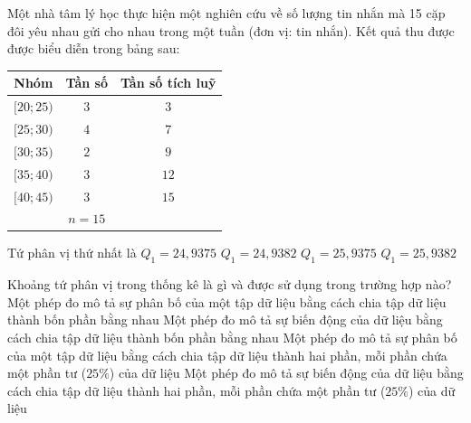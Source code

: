 \begin{ex}%
	Một nhà tâm lý học thực hiện một nghiên cứu về số lượng tin nhắn mà 15 cặp đôi yêu nhau gửi cho nhau trong một tuần (đơn vị: tin nhắn). Kết quả thu được được biểu diễn trong bảng sau:
	\begin{center}
		\begin{tabular}{|c|c|c|}
			\hline 
			Nhóm & Tần số & Tần số tích luỹ \\
			\hline 
			$[20; 25)$ & $3$ & $3$ \\
			$[25; 30)$ & $4$ & $7$ \\
			$[30; 35)$ & $2$ & $9$ \\
			$[35; 40)$ & $3$ & $12$ \\
			$[40; 45)$ & $3$ & $15$ \\
			\hline 
			& $n=15$ & \\
			\hline
		\end{tabular}
	\end{center}
	Tứ phân vị thứ nhất là
	\choice
	{$Q_1=24{,}9375$}
	{$Q_1=24{,}9382$}
	{\True $Q_1=25{,}9375$}
	{$Q_1= 25{,}9382$}
	\loigiai{
		Số lượng mẫu là $n=15$.\\
		Ta có $\dfrac{n}{4}=\dfrac{15}{4}=3{,}75$, và nằm trong nhóm $[25; 30)$. \\
		Vậy $Q_1=25+\left(\dfrac{3{,}75-3}{4}\right) \cdot 5 = 25+\left(\dfrac{0{,}75}{4}\right) \cdot 5 = 25+0{,}9375 = 25{,}9375$.
	}
\end{ex}
\begin{ex}%
	Khoảng tứ phân vị trong thống kê là gì và được sử dụng trong trường hợp nào?
	\choice
	{\True Một phép đo mô tả sự phân bố của một tập dữ liệu bằng cách chia tập dữ liệu thành bốn phần bằng nhau}
	{Một phép đo mô tả sự biến động của dữ liệu bằng cách chia tập dữ liệu thành bốn phần bằng nhau}
	{Một phép đo mô tả sự phân bố của một tập dữ liệu bằng cách chia tập dữ liệu thành hai phần, mỗi phần chứa một phần tư ($25\%$) của dữ liệu}
	{Một phép đo mô tả sự biến động của dữ liệu bằng cách chia tập dữ liệu thành hai phần, mỗi phần chứa một phần tư ($25\%$) của dữ liệu}
\end{ex}

